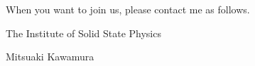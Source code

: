 \documentclass[letterpaper,10pt,pdftex,openany,english]{sphinxmanual}
\begin{document}
\sphinxAtStartPar
{}

\sphinxAtStartPar
When you want to join us, please contact me as follows.

\sphinxAtStartPar
The Institute of Solid State Physics

\sphinxAtStartPar
Mitsuaki Kawamura

\sphinxAtStartPar
{}



\renewcommand{\indexname}{Index}
\printindex
\end{document}

